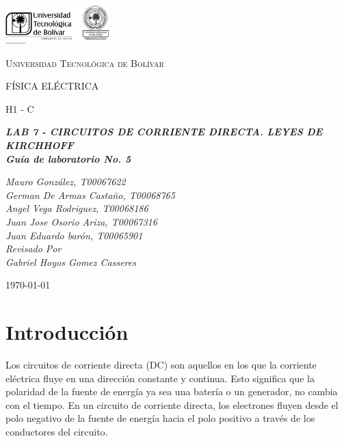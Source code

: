 \documentclass[twocolumn, 12pt]{article}
\begin{document}

\begin{titlepage}
	\centering
	\includegraphics[width=0.3\textwidth]{Images/logo_utb.png}\par\vspace{1cm}
	{\scshape\LARGE Universidad Tecnológica de Bolívar \par}
	\vspace{1cm}

	{\scshape\Large FÍSICA ELÉCTRICA \par}
	\vspace{.2cm}

	{\scshape\Large H1 - C \par}
	\vspace{1cm}
	\slshape {\Large \bfseries{} LAB 7 - CIRCUITOS DE CORRIENTE DIRECTA. LEYES DE KIRCHHOFF  \\}
	\slshape {\small \bfseries{} Guía de laboratorio No. 5}
	\vspace{1cm}

	\slshape {\itshape{} Mauro González, T00067622 \\}
	\slshape {\itshape{} German De Armas Castaño, T00068765 \\}
	\slshape {\itshape{} Angel Vega Rodriguez, T00068186 \\}
	\slshape {\itshape{} Juan Jose Osorio Ariza, T00067316 \\}
	\slshape {\itshape{} Juan Eduardo barón, T00065901 \\}
	\vfill
	Revisado Por \\
	Gabriel Hoyos Gomez Casseres\\
	{\large \today\par}
\end{titlepage}

\section{Introducción}

Los circuitos de corriente directa (DC) son aquellos en los
que la corriente eléctrica fluye en una dirección constante
y continua. Esto significa que la polaridad de la fuente de
energía ya sea una batería o un generador, no cambia con el
tiempo. En un circuito de corriente directa, los electrones
fluyen desde el polo negativo de la fuente de energía hacia
el polo positivo a través de los conductores del circuito.
\end{document}
